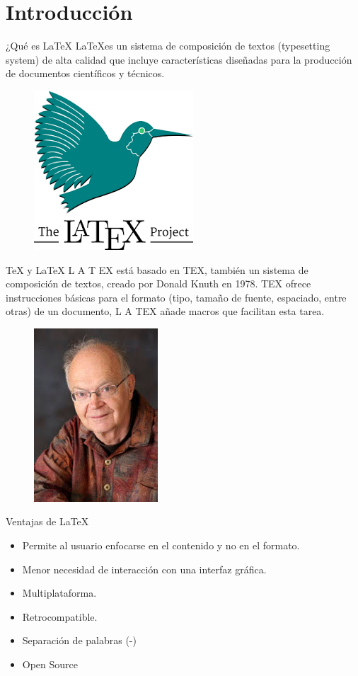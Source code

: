 \documentclass[10pt,xcolor={dvipsnames}]{beamer}
\begin{document}
\section{Introducción}
\begin{frame}{¿Qué es LaTeX}
	\LaTeX es un sistema de composición de textos (typesetting system) de alta
	calidad que incluye características diseñadas para la producción de documentos
	científicos y técnicos.
	\begin{figure}[h]
		\includegraphics[scale=0.5]{img/LaTeX}
	\end{figure}
\end{frame}
\begin{frame}{TeX y LaTeX}
L A T
EX está basado en TEX, también un sistema
de composición de textos, creado por Donald
Knuth en 1978.
TEX ofrece instrucciones básicas para el formato
(tipo, tamaño de fuente, espaciado, entre otras)
de un documento, L A TEX añade macros que
facilitan esta tarea.
\begin{figure}[h]
	\includegraphics[scale=0.5]{img/Donald}
\end{figure}
\end{frame}
\begin{frame}{Ventajas de \LaTeX}
\begin{itemize}
	\item Permite al usuario enfocarse en el contenido y no en el formato.
	\item Menor necesidad de interacción con una interfaz gráfica.
	\item Multiplataforma.
	\item Retrocompatible.
	\item Separación de palabras (-)
	\item Open Source
\end{itemize}
\end{frame}
\end{document}
